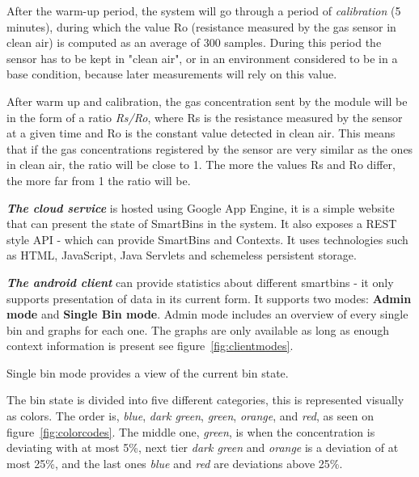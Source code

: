 After the warm-up period, the system will go through a period of \textit{calibration} (5 minutes), during which the value Ro (resistance measured by the gas sensor in clean air) is computed as an average of 300 samples.
During this period the sensor has to be kept in "clean air", or  in an environment considered to be in a base condition, because later measurements will rely on this value.

After warm up and calibration, the gas concentration sent by the module will be in the form of a ratio \textit{Rs/Ro}, where Rs is the resistance measured by the sensor at a given time and Ro is the constant value detected in clean air.
This means that if the gas concentrations registered by the sensor are very similar as the ones in clean air, the ratio will be close to 1.
The more the values Rs and Ro differ, the more far from 1 the ratio will be.

\textit{\textbf{The cloud service}} is hosted using Google App Engine, it is a simple website that can present the state of SmartBins in the system. It also exposes a REST style API - which can provide SmartBins and Contexts.
It uses technologies such as HTML, JavaScript, Java Servlets and schemeless persistent storage.

\textit{\textbf{The android client}} can provide statistics about different smartbins - it only supports  presentation of data in its current form.
It supports two modes: \textbf{Admin mode} and \textbf{Single Bin mode}.
Admin mode includes an overview of every single bin and graphs for each one. The graphs are only available as long as enough context information is present see figure~\ref{fig:clientmodes}.

 Single bin mode provides a view of the current bin state.
 
 The bin state is divided into five different categories, this is represented visually as colors.
 The order is, \textit{blue}, \textit{dark green}, \textit{green}, \textit{orange}, and \textit{red}, as seen on figure~\ref{fig:colorcodes}.
The middle one, \textit{green}, is when the concentration is deviating with at most 5\%, next tier \textit{dark green} and \textit{orange} is a deviation of at most 25\%, and the last ones \textit{blue} and \textit{red} are deviations above 25\%.

